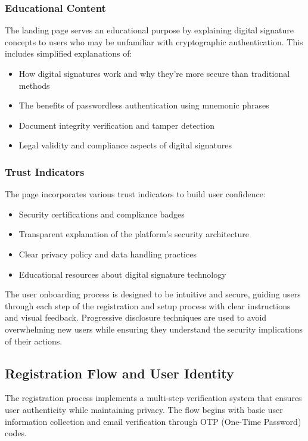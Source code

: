 \subsubsection{Educational Content}
The landing page serves an educational purpose by explaining digital signature concepts to users who may be unfamiliar with cryptographic authentication. This includes simplified explanations of:

\begin{itemize}
    \item How digital signatures work and why they're more secure than traditional methods
    \item The benefits of passwordless authentication using mnemonic phrases
    \item Document integrity verification and tamper detection
    \item Legal validity and compliance aspects of digital signatures
\end{itemize}

\subsubsection{Trust Indicators}
The page incorporates various trust indicators to build user confidence:

\begin{itemize}
    \item Security certifications and compliance badges
    \item Transparent explanation of the platform's security architecture
    \item Clear privacy policy and data handling practices
    \item Educational resources about digital signature technology
\end{itemize}

The user onboarding process is designed to be intuitive and secure, guiding users through each step of the registration and setup process with clear instructions and visual feedback. Progressive disclosure techniques are used to avoid overwhelming new users while ensuring they understand the security implications of their actions.

\subsection{Registration Flow and User Identity}
The registration process implements a multi-step verification system that ensures user authenticity while maintaining privacy. The flow begins with basic user information collection and email verification through OTP (One-Time Password) codes.

